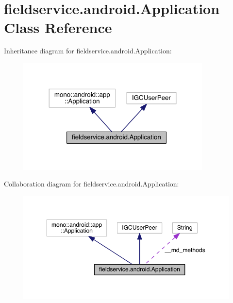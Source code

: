 \hypertarget{classfieldservice_1_1android_1_1_application}{\section{fieldservice.\+android.\+Application Class Reference}
\label{classfieldservice_1_1android_1_1_application}
}


Inheritance diagram for fieldservice.\+android.\+Application\+:
\nopagebreak
\begin{figure}[H]
\begin{center}
\leavevmode
\includegraphics[width=276pt]{classfieldservice_1_1android_1_1_application__inherit__graph}
\end{center}
\end{figure}


Collaboration diagram for fieldservice.\+android.\+Application\+:
\nopagebreak
\begin{figure}[H]
\begin{center}
\leavevmode
\includegraphics[width=350pt]{classfieldservice_1_1android_1_1_application__coll__graph}
\end{center}
\end{figure}
